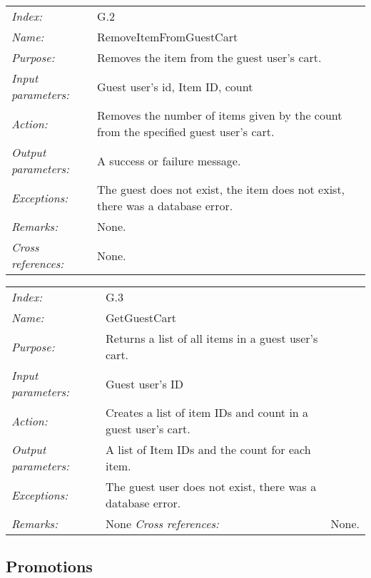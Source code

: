 \documentclass[10pt,letter]{article}
\begin{document}
\begin{tabularx}{\textwidth}{l X}
    \it{Index:} & G.2 \\
    \it{Name:} & RemoveItemFromGuestCart \\
    \it{Purpose:} & Removes the item from the guest user's cart. \\
    \it{Input parameters:} & Guest user's id, Item ID, count \\
    \it{Action:} & Removes the number of items given by the count from the specified guest user's cart. \\
    \it{Output parameters:} & A success or failure message. \\
    \it{Exceptions:} & The guest does not exist, the item does not exist, there was a database error. \\
    \it{Remarks:} & None. \\
    \it{Cross references:} & None. \\
    \hline
\end{tabularx}

\begin{tabularx}{\textwidth}{l X}
    \it{Index:} & G.3 \\
    \it{Name:} & GetGuestCart \\
    \it{Purpose:} & Returns a list of all items in a guest user's cart. \\
    \it{Input parameters:} & Guest user's ID \\
    \it{Action:} & Creates a list of item IDs and count in a guest user's cart. \\
    \it{Output parameters:} & A list of Item IDs and the count for each item. \\
    \it{Exceptions:} & The guest user does not exist, there was a database error. \\
    \it{Remarks:} & None 
    \it{Cross references:} & None. \\
    \hline
\end{tabularx}

\subsection{Promotions}
\end{document}
